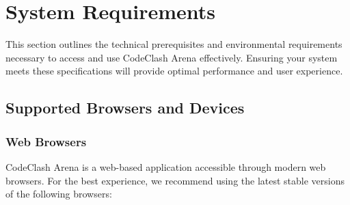 \documentclass[12pt]{article}
\begin{document}
\begin{minipage}{\textwidth}
\label{tab:core-features}
\end{minipage}
\FloatBarrier

\section{System Requirements}

This section outlines the technical prerequisites and environmental requirements necessary to access and use CodeClash Arena effectively. Ensuring your system meets these specifications will provide optimal performance and user experience.

\subsection{Supported Browsers and Devices}

\subsubsection{Web Browsers}

CodeClash Arena is a web-based application accessible through modern web browsers. For the best experience, we recommend using the latest stable versions of the following browsers:
\end{document}
